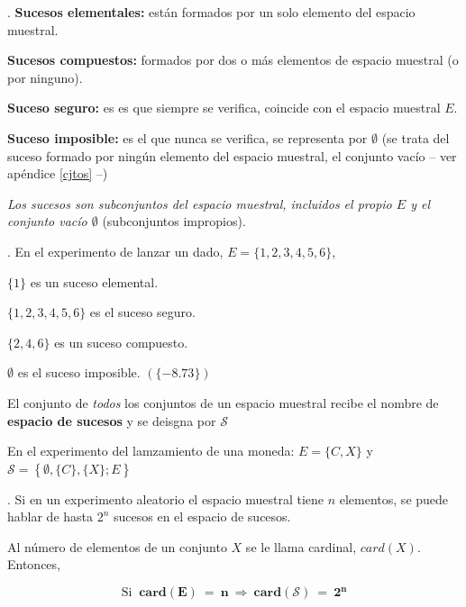 \begin{definition}
.	\textbf{Sucesos elementales:} están formados por un solo elemento del espacio muestral.

\textbf{Sucesos compuestos:} formados por dos o más elementos de espacio muestral (o por ninguno).

\vspace{2mm} \textbf{Suceso seguro:} es es que siempre se verifica, coincide con el espacio muestral $E$.

\textbf{Suceso imposible:} es el que nunca se verifica, se representa por $\emptyset$ (se trata del suceso formado por ningún elemento del espacio muestral, el conjunto vacío -- ver apéndice \ref{cjtos} --)

\vspace{2mm} \emph{Los sucesos son subconjuntos del espacio muestral, incluidos el propio $E$ y el conjunto vacío  $\emptyset$} (subconjuntos impropios).
\end{definition}

\begin{example}
. En el experimento de lanzar un dado, 	$E=\{1,2,3,4,5,6\}$,

\begin{multicols}{2}
\begin{small}
$\{1\}$ es un suceso elemental.

$\{1,2,3,4,5,6\}$ es el suceso seguro.

$\{2,4,6\}$ es un suceso compuesto.	

$\emptyset$ es el suceso imposible. \textcolor{gris}{$(\{-8.73\})$}
\end{small}
\end{multicols}
\end{example}

El conjunto de \emph{todos} los conjuntos de un espacio muestral recibe el nombre de \textbf{espacio de sucesos} y se deisgna por $\mathcal S$

\vspace{2mm} En el experimento del lamzamiento de una moneda:
$E=\{C,X\}$ y $\mathcal S= \left\{  {\emptyset, \{C\}, \{X\};  E} \right\} $ 

\begin{theorem}
. Si en un experimento aleatorio el espacio muestral tiene $n$ elementos, se puede hablar de hasta $2^n$ sucesos en el espacio de sucesos.

\vspace{2mm} Al número de elementos de un conjunto $X$ se le llama cardinal, $card(X)$. Entonces,

$$\text{Si } \ \boldsymbol{ card(E)\ = \ n \ \Rightarrow \ card(\mathcal S)\ = \ 2^n } $$ 
\end{theorem}

